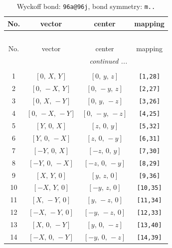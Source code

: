 \documentclass[fleqn,8pt]{jsarticle}
\begin{document}
\begin{longtable}{cccc}
\caption{Wyckoff bond: {\tt 96a@96j}, bond symmetry: {\tt m..}}
 \\
 \hline \hline
No. & vector & center & mapping \\ \hline \endfirsthead

\multicolumn{3}{l}{\tablename\ \thetable{}} \\
 \hline \hline
No. & vector & center & mapping \\ \hline \endhead

 \hline \hline
\multicolumn{3}{r}{\footnotesize\it continued ...} \\ \endfoot

 \hline \hline
\multicolumn{3}{r}{} \\ \endlastfoot

1 & $\left[ 0,\, X,\, Y \right]$ & $\left[ 0,\, y,\, z \right]$ & {\tt [1,28]} \\ \hline
2 & $\left[ 0,\, - X,\, Y \right]$ & $\left[ 0,\, - y,\, z \right]$ & {\tt [2,27]} \\ \hline
3 & $\left[ 0,\, X,\, - Y \right]$ & $\left[ 0,\, y,\, - z \right]$ & {\tt [3,26]} \\ \hline
4 & $\left[ 0,\, - X,\, - Y \right]$ & $\left[ 0,\, - y,\, - z \right]$ & {\tt [4,25]} \\ \hline
5 & $\left[ Y,\, 0,\, X \right]$ & $\left[ z,\, 0,\, y \right]$ & {\tt [5,32]} \\ \hline
6 & $\left[ Y,\, 0,\, - X \right]$ & $\left[ z,\, 0,\, - y \right]$ & {\tt [6,31]} \\ \hline
7 & $\left[ - Y,\, 0,\, X \right]$ & $\left[ - z,\, 0,\, y \right]$ & {\tt [7,30]} \\ \hline
8 & $\left[ - Y,\, 0,\, - X \right]$ & $\left[ - z,\, 0,\, - y \right]$ & {\tt [8,29]} \\ \hline
9 & $\left[ X,\, Y,\, 0 \right]$ & $\left[ y,\, z,\, 0 \right]$ & {\tt [9,36]} \\ \hline
10 & $\left[ - X,\, Y,\, 0 \right]$ & $\left[ - y,\, z,\, 0 \right]$ & {\tt [10,35]} \\ \hline
11 & $\left[ X,\, - Y,\, 0 \right]$ & $\left[ y,\, - z,\, 0 \right]$ & {\tt [11,34]} \\ \hline
12 & $\left[ - X,\, - Y,\, 0 \right]$ & $\left[ - y,\, - z,\, 0 \right]$ & {\tt [12,33]} \\ \hline
13 & $\left[ X,\, 0,\, - Y \right]$ & $\left[ y,\, 0,\, - z \right]$ & {\tt [13,40]} \\ \hline
14 & $\left[ - X,\, 0,\, - Y \right]$ & $\left[ - y,\, 0,\, - z \right]$ & {\tt [14,39]} \\ \hline

\end{longtable}
\end{document}
